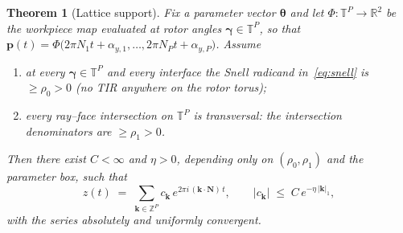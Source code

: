 \documentclass[twocolumn,preprintnumbers,amsmath,amssymb,pra,floatfix]{revtex4-2}
\newcommand{\vect}[1]{\bm{#1}}
\newtheorem{theorem}{Theorem}
\begin{document}
\begin{theorem}[Lattice support]
\label{thm:lattice}
Fix a parameter vector $\vect{\theta}$ and let
$\Phi:\mathbb{T}^{P}\to\mathbb{R}^{2}$ be the workpiece map evaluated
at rotor angles $\vect{\gamma}\in\mathbb{T}^{P}$, so that
$\vect{p}(t)=\Phi\bigl(2\pi N_1t+\alpha_{y,1},\dots,
2\pi N_Pt+\alpha_{y,P}\bigr)$.  Assume
\begin{enumerate}
\item[(H1)] at every $\vect{\gamma}\in\mathbb{T}^{P}$ and every
  interface the Snell radicand in~\eqref{eq:snell} is
  $\ge\rho_0>0$ (no TIR anywhere on the rotor torus);
\item[(H2)] every ray--face intersection on $\mathbb{T}^{P}$ is
  transversal: the intersection denominators are $\ge\rho_1>0$.
\end{enumerate}
Then there exist $C<\infty$ and $\eta>0$, depending only on
$(\rho_0,\rho_1)$ and the parameter box, such that
\begin{equation}
  z(t) \;=\; \sum_{\vect{k}\in\mathbb{Z}^P} c_{\vect{k}}\,
  e^{2\pi i\,(\vect{k}\cdot\vect{N})\,t},
  \qquad
  |c_{\vect{k}}|\;\le\;C\,e^{-\eta\,|\vect{k}|_1},
  \label{eq:latticemodel}
\end{equation}
with the series absolutely and uniformly convergent.
\end{theorem}
\end{document}
